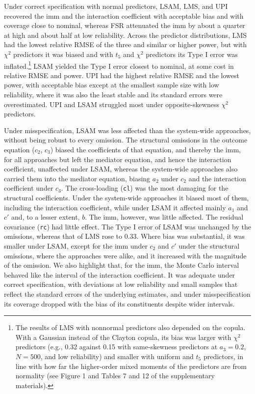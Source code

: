 \documentclass[
  man,
  longtable,
  nolmodern,
  notxfonts,
  notimes,
  colorlinks=true,linkcolor=blue,citecolor=blue,urlcolor=blue]{apa7}
\begin{document}
Under correct specification with normal predictors, LSAM, LMS, and UPI
recovered the imm and the interaction coefficient with acceptable bias
and with coverage close to nominal, whereas FSR attenuated the imm by
about a quarter at high and about half at low reliability. Across the
predictor distributions, LMS had the lowest relative RMSE of the three
and similar or higher power, but with \(\chi^2\) predictors it was
biased and with \(t_5\) and \(\chi^2\) predictors its Type I error was
inflated.\footnote{The results of LMS with nonnormal predictors also
  depended on the copula. With a Gaussian instead of the Clayton copula,
  its bias was larger with \(\chi^2\) predictors (e.g., 0.32 against
  0.15 with same-skewness predictors at \(a_3 = 0.2\), \(N = 500\), and
  low reliability) and smaller with uniform and \(t_5\) predictors, in
  line with how far the higher-order mixed moments of the predictors are
  from normality (see Figure 1 and Tables 7 and 12 of the supplementary
  materials).} LSAM yielded the Type I error closest to nominal, at some
cost in relative RMSE and power. UPI had the highest relative RMSE and
the lowest power, with acceptable bias except at the smallest sample
size with low reliability, where it was also the least stable and its
standard errors were overestimated. UPI and LSAM struggled most under
opposite-skewness \(\chi^2\) predictors.

Under misspecification, LSAM was less affected than the system-wide
approaches, without being robust to every omission. The structural
omissions in the outcome equation (\(c_2\), \(c_3\)) biased the
coefficients of that equation, and thereby the imm, for all approaches
but left the mediator equation, and hence the interaction coefficient,
unaffected under LSAM, whereas the system-wide approaches also carried
them into the mediator equation, biasing \(a_2\) under \(c_2\) and the
interaction coefficient under \(c_3\). The cross-loading (\texttt{cl})
was the most damaging for the structural coefficients. Under the
system-wide approaches it biased most of them, including the interaction
coefficient, while under LSAM it affected mainly \(a_1\) and \(c'\) and,
to a lesser extent, \(b\). The imm, however, was little affected. The
residual covariance (\texttt{rc}) had little effect. The Type I error of
LSAM was unchanged by the omissions, whereas that of LMS rose to 0.33.
Where bias was substantial, it was smaller under LSAM, except for the
imm under \(c_2\) and \(c'\) under the structural omissions, where the
approaches were alike, and it increased with the magnitude of the
omission. We also highlight that, for the imm, the Monte Carlo interval
behaved like the interval of the interaction coefficient. It was
adequate under correct specification, with deviations at low reliability
and small samples that reflect the standard errors of the underlying
estimates, and under misspecification its coverage dropped with the bias
of its constituents despite wider intervals.
\end{document}
